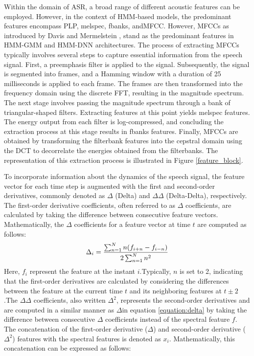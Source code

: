 Within the domain of \ac{ASR}, a broad range of different acoustic features can be employed. However, in the context of \ac{HMM}-based models, the predominant features encompass  \ac{PLP}, \ac{melspec}, \ac{fbanks}, and\ac{MFCC}. However, \acp{MFCC} as introduced by Davis and Mermelstein \cite{mfcc}, stand as the predominant features in \ac{HMM-GMM} and \ac{HMM-DNN} architectures.
The process of extracting \acp{MFCC} typically involves several steps to capture essential information from the speech signal. First, a preemphasis filter is applied to the signal. Subsequently, the signal is segmented into frames, and a Hamming window with a duration of 25 milliseconds is applied to each frame. The frames are then transformed into the frequency domain using the discrete \ac{FFT}, resulting in the magnitude spectrum.
The next stage involves passing the magnitude spectrum through a bank of triangular-shaped filters. Extracting features at this point yields melspec features. The energy output from each filter is log-compressed, and concluding the extraction process at this stage results in fbanks features. Finally, \acp{MFCC} are obtained by transforming the filterbank features into the cepstral domain using the \ac{DCT} to decorrelate the energies obtained from the filterbanks. The representation of this extraction process is illustrated in Figure \ref{feature_block}.



To incorporate information about the dynamics of the speech signal, the feature vector for each time step is augmented with the first and second-order derivatives, commonly denoted as $\Delta$ (Delta) and $\Delta\Delta$ (Delta-Delta), respectively. The first-order derivative coefficients, often referred to as $\Delta$ coefficients, are calculated by taking the difference between consecutive feature vectors. Mathematically, the $\Delta$ coefficients for a feature vector at time $t$ are computed as follows:
\begin{equation}
 \label{equation:delta}
    \Delta_i = \frac{\sum^{N}_{n=1}n(f_{i+n} - f_{i-n})}{2 \sum^N_{n=1}n^2} \\
\end{equation}
Here, $f_i$ represent the feature at the instant $i$.Typically, $n$ is set to 2, indicating that the first-order derivatives are calculated by considering the differences between the feature at the current time $t$ and its neighboring features at $t \pm 2$.The $\Delta\Delta$ coefficients, also written $\Delta^2$, represents the second-order derivatives and are computed in a similar manner as $\Delta$in equation \ref{equation:delta} by taking the difference between consecutive $\Delta$ coefficients instead of the spectral feature $f$. The concatenation of the first-order derivative ($\Delta$) and second-order derivative ($\Delta^2$) features with the spectral features is denoted as $x_i$. Mathematically, this concatenation can be expressed as follows:

